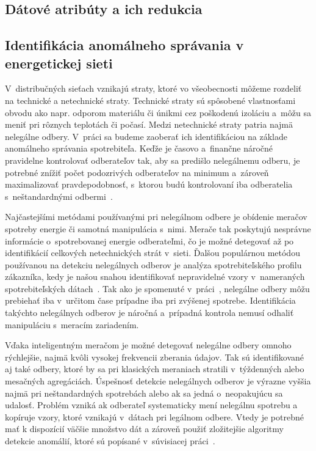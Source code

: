 \documentclass[a4paper,twoside,slovak,12pt]{article}
\begin{document}
\subsection{Dátové atribúty a ich redukcia}


\subsection{Identifikácia anomálneho správania v energetickej sieti}
V~distribučných sieťach vznikajú straty, ktoré vo všeobecnosti môžeme rozdeliť
na technické a netechnické straty. Technické straty sú spôsobené vlastnosťami
obvodu ako napr. odporom materiálu či únikmi cez poškodenú izoláciu a~môžu sa
meniť pri rôznych teplotách či počasí. Medzi netechnické straty patria najmä
nelegálne odbery. V~práci sa budeme zaoberať ich identifikáciou na základe
anomálneho správania spotrebiteľa. Keďže je časovo a~finančne náročné
pravidelne kontrolovať odberateľov tak, aby sa predišlo nelegálnemu odberu,
je potrebné znížiť počet podozrivých odberateľov na minimum a~zároveň
maximalizovať pravdepodobnosť, s~ktorou budú kontrolovaní iba odberatelia
s~neštandardnými odbermi~\cite{Coma-Puig2016,Sahoo2015}.

Najčastejšími metódami používanými pri nelegálnom odbere je obídenie meračov
spotreby energie či samotná manipulácia s~nimi. Merače tak poskytujú nesprávne
informácie o~spotrebovanej energie odberateľmi, čo je možné detegovať až po
identifikácií celkových netechnických strát v~sieti. Ďalšou populárnou metódou
používanou na detekciu nelegálnych odberov je analýza spotrebiteľského
profilu zákazníka, kedy je našou snahou identifikovať nepravidelné vzory
v~nameraných spotrebiteľských dátach~\cite{Sahoo2015}. Tak ako je spomenuté
v~práci~\cite{Depuru2012}, nelegálne odbery môžu prebiehať iba v~určitom čase
prípadne iba pri zvýšenej spotrebe. Identifikácia takýchto nelegálnych odberov
je náročná a~prípadná kontrola nemusí odhaliť manipuláciu s~meracím zariadením.

Vďaka inteligentným meračom je možné detegovať nelegálne odbery omnoho
rýchlejšie, najmä kvôli vysokej frekvencii zberania údajov. Tak sú
identifikované aj také odbery, ktoré by sa pri klasických meraniach stratili
v~týždenných alebo mesačných agregáciách. Úspešnosť detekcie nelegálnych odberov
je výrazne vyššia najmä pri neštandardných spotrebách alebo ak sa jedná
o~neopakujúcu sa udalosť. Problém vzniká ak odberateľ systematicky mení
nelegálnu spotrebu a kopíruje vzory, ktoré vznikajú v~dátach pri legálnom
odbere. Vtedy je potrebné mať k dispozícií väčšie množstvo dát a zároveň použiť
zložitejšie algoritmy detekcie anomálií, ktoré sú popísané v~súvisiacej
práci~\cite{Nikovski2013}.
\end{document}
